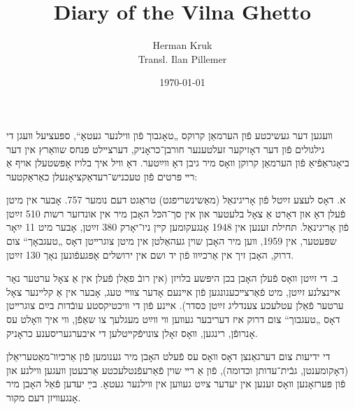 \documentclass{article}
\begin{document}
\renewcommand{\abstractname}{\vspace{-\baselineskip}}
\title{Diary of the Vilna Ghetto}
\author{Herman Kruk  \\ Transl. Ilan Pillemer}
\date{\today}

\maketitle

\tableofcontents
\newpage

\begin{pairs}

\begin{Rightside}

\begin{RTL}
\begin{hebrew}
\beginnumbering

\autopar

װעגען דער געשיכטע פֿון הערמאַן קרוקס „טאָגבוך פֿון װילנער געטאָ“, ספּעציעל װעגן די גילגולים פֿון דער דאָזיקער זעלטענער חורבן־כראָניק,
דערצײלט פּנחס שװאַרץ אין דער ביאָגראַפֿיאַ פֿון הערמאַן קרוקן װאָס מיר גיבן דאָ װײַטער.
דאָ װיל איך בלויז אָפּשטעלן אויף אַ רײ פּרטים פֿון טעכניש־רעדאַקציאָנעלן כאַראַקטער:

א. דאָס לעצע זײַטל פֿון אָריגינאַל (מאַשינשריפגט) טראַגט דעם נומער 757.
אָבער אין מיטן פֿעלן דאָ און דאָרט אַ צאָל בלעטער און אין סך־הכּל האָבן מיר אין אונדזער רשות 510 זײַטן פֿון אָריגינאַל.
תּחילת זענען אין 1948 אָנגעקומען קײן ניו־יאָרק 380 זײַטן, אָבער מיט 11 ײַאָר שפּעטער, אין 1959,
װען מיר האָבן שוין געהאַלטן אין מיטן צוגרײטן דאָס „טעגבאָך“ צום דרוק, האָבן זיך אין אַרכײַװ פֿון יד ושם אין ירושלים אָפּגעפֿונען נאָך 130 זײַטן.

ב. די זײַטן װאָס פֿעלן האָבן בכן היפּשע בלויזן (אין רובֿ פאַלן פֿעלן  אין אַ צאָל ערטער נאָר אײנצלנע זײַטן, מיט פֿאַרצײכענונגען
פֿון אײנעם אָדער צװײ טעג, אָבער אין אַ קלײנער צאָל ערטער פֿאַלן עטלעכע צענדליג זײַטן כּסדר).
אײנע פֿון די װיכטיקסטע עובֿדות בײַם צוגרײטן דאָס „טעגבוך“ צום דרוק איז דעריבער געװען װי װײַט מעגלעך צו שאַפֿן, װי איך װאָלט עס אָנרופֿן, 
רינגען, װאָס זאָלן צונויפֿקײטלען די איבערגעריסענע כראָניק.

די ידיעות צום דערגאַנצן דאָס װאָס עס פֿעלט האָבן מיר גענומען פֿון אַרכיװ־מאַטעריאַלן (דאָקומענטן, גבֿית־עדותן וכדומה), פֿון אַ רײ שוין פֿאַרעפֿנטלעכטע
אַרבעטן װעגען װילנע און פֿון פּערזאָנען װאָס זענען אין יעדער צײַט געװען אין
װילנער געטאָ. בײַ יעדען פֿאַל האָבן מיר אָנגעװיזן דעם מקור.


\end{hebrew}
\end{RTL}
\end{Rightside}
\end{pairs}
\end{document}
